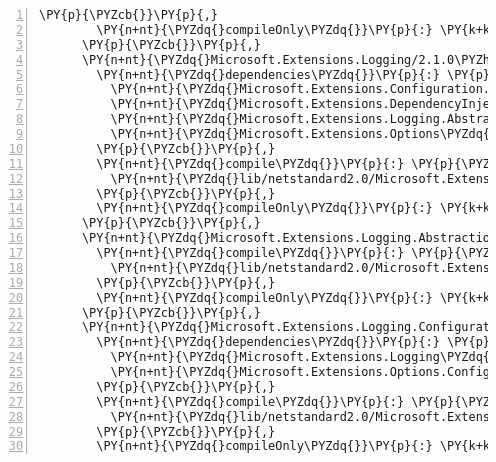 \begin{Verbatim}[commandchars=\\\{\},numbers=left,firstnumber=1,stepnumber=1,numberblanklines=0]
        \PY{p}{\PYZcb{}}\PY{p}{,}
        \PY{n+nt}{\PYZdq{}compileOnly\PYZdq{}}\PY{p}{:} \PY{k+kc}{true}
      \PY{p}{\PYZcb{}}\PY{p}{,}
      \PY{n+nt}{\PYZdq{}Microsoft.Extensions.Logging/2.1.0\PYZhy{}rc1\PYZhy{}final\PYZdq{}}\PY{p}{:} \PY{p}{\PYZob{}}
        \PY{n+nt}{\PYZdq{}dependencies\PYZdq{}}\PY{p}{:} \PY{p}{\PYZob{}}
          \PY{n+nt}{\PYZdq{}Microsoft.Extensions.Configuration.Binder\PYZdq{}}\PY{p}{:} \PY{l+s+s2}{\PYZdq{}2.1.0\PYZhy{}rc1\PYZhy{}final\PYZdq{}}\PY{p}{,}
          \PY{n+nt}{\PYZdq{}Microsoft.Extensions.DependencyInjection.Abstractions\PYZdq{}}\PY{p}{:} \PY{l+s+s2}{\PYZdq{}2.1.0\PYZhy{}rc1\PYZhy{}final\PYZdq{}}\PY{p}{,}
          \PY{n+nt}{\PYZdq{}Microsoft.Extensions.Logging.Abstractions\PYZdq{}}\PY{p}{:} \PY{l+s+s2}{\PYZdq{}2.1.0\PYZhy{}rc1\PYZhy{}final\PYZdq{}}\PY{p}{,}
          \PY{n+nt}{\PYZdq{}Microsoft.Extensions.Options\PYZdq{}}\PY{p}{:} \PY{l+s+s2}{\PYZdq{}2.1.0\PYZhy{}rc1\PYZhy{}final\PYZdq{}}
        \PY{p}{\PYZcb{}}\PY{p}{,}
        \PY{n+nt}{\PYZdq{}compile\PYZdq{}}\PY{p}{:} \PY{p}{\PYZob{}}
          \PY{n+nt}{\PYZdq{}lib/netstandard2.0/Microsoft.Extensions.Logging.dll\PYZdq{}}\PY{p}{:} \PY{p}{\PYZob{}}\PY{p}{\PYZcb{}}
        \PY{p}{\PYZcb{}}\PY{p}{,}
        \PY{n+nt}{\PYZdq{}compileOnly\PYZdq{}}\PY{p}{:} \PY{k+kc}{true}
      \PY{p}{\PYZcb{}}\PY{p}{,}
      \PY{n+nt}{\PYZdq{}Microsoft.Extensions.Logging.Abstractions/2.1.0\PYZhy{}rc1\PYZhy{}final\PYZdq{}}\PY{p}{:} \PY{p}{\PYZob{}}
        \PY{n+nt}{\PYZdq{}compile\PYZdq{}}\PY{p}{:} \PY{p}{\PYZob{}}
          \PY{n+nt}{\PYZdq{}lib/netstandard2.0/Microsoft.Extensions.Logging.Abstractions.dll\PYZdq{}}\PY{p}{:} \PY{p}{\PYZob{}}\PY{p}{\PYZcb{}}
        \PY{p}{\PYZcb{}}\PY{p}{,}
        \PY{n+nt}{\PYZdq{}compileOnly\PYZdq{}}\PY{p}{:} \PY{k+kc}{true}
      \PY{p}{\PYZcb{}}\PY{p}{,}
      \PY{n+nt}{\PYZdq{}Microsoft.Extensions.Logging.Configuration/2.1.0\PYZhy{}rc1\PYZhy{}final\PYZdq{}}\PY{p}{:} \PY{p}{\PYZob{}}
        \PY{n+nt}{\PYZdq{}dependencies\PYZdq{}}\PY{p}{:} \PY{p}{\PYZob{}}
          \PY{n+nt}{\PYZdq{}Microsoft.Extensions.Logging\PYZdq{}}\PY{p}{:} \PY{l+s+s2}{\PYZdq{}2.1.0\PYZhy{}rc1\PYZhy{}final\PYZdq{}}\PY{p}{,}
          \PY{n+nt}{\PYZdq{}Microsoft.Extensions.Options.ConfigurationExtensions\PYZdq{}}\PY{p}{:} \PY{l+s+s2}{\PYZdq{}2.1.0\PYZhy{}rc1\PYZhy{}final\PYZdq{}}
        \PY{p}{\PYZcb{}}\PY{p}{,}
        \PY{n+nt}{\PYZdq{}compile\PYZdq{}}\PY{p}{:} \PY{p}{\PYZob{}}
          \PY{n+nt}{\PYZdq{}lib/netstandard2.0/Microsoft.Extensions.Logging.Configuration.dll\PYZdq{}}\PY{p}{:} \PY{p}{\PYZob{}}\PY{p}{\PYZcb{}}
        \PY{p}{\PYZcb{}}\PY{p}{,}
        \PY{n+nt}{\PYZdq{}compileOnly\PYZdq{}}\PY{p}{:} \PY{k+kc}{true}

\end{Verbatim}
